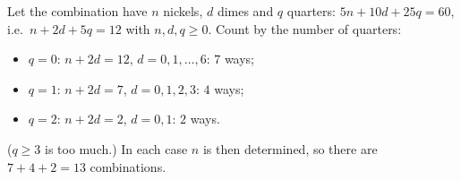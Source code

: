 Let the combination have $n$ nickels, $d$ dimes and $q$ quarters: $5n+10d+25q=60$, i.e.\ $n+2d+5q=12$ with $n,d,q\ge0$. Count by the number of quarters:
\begin{itemize}
\item $q=0$: $n+2d=12$, $d=0,1,\dots,6$: $7$ ways;
\item $q=1$: $n+2d=7$, $d=0,1,2,3$: $4$ ways;
\item $q=2$: $n+2d=2$, $d=0,1$: $2$ ways.
\end{itemize}
($q\ge3$ is too much.) In each case $n$ is then determined, so there are $7+4+2=\boxed{13}$ combinations.
